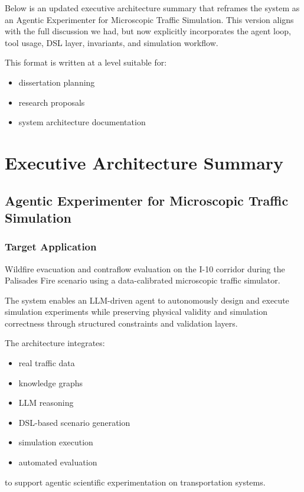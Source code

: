 
Below is an updated executive architecture summary that reframes the system as an Agentic Experimenter for Microscopic Traffic Simulation.
This version aligns with the full discussion we had, but now explicitly incorporates the agent loop, tool usage, DSL layer, invariants, and simulation workflow.

This format is written at a level suitable for:

\begin{itemize}
\item dissertation planning


\item research proposals


\item system architecture documentation


\end{itemize}
\chapter*{Executive Architecture Summary}
\section*{Agentic Experimenter for Microscopic Traffic Simulation}
\subsection*{Target Application}
Wildfire evacuation and contraflow evaluation on the I-10 corridor during the Palisades Fire scenario using a data-calibrated microscopic traffic simulator.

The system enables an LLM-driven agent to autonomously design and execute simulation experiments while preserving physical validity and simulation correctness through structured constraints and validation layers.

The architecture integrates:

\begin{itemize}
\item real traffic data


\item knowledge graphs


\item LLM reasoning


\item DSL-based scenario generation


\item simulation execution


\item automated evaluation


\end{itemize}
to support agentic scientific experimentation on transportation systems.


